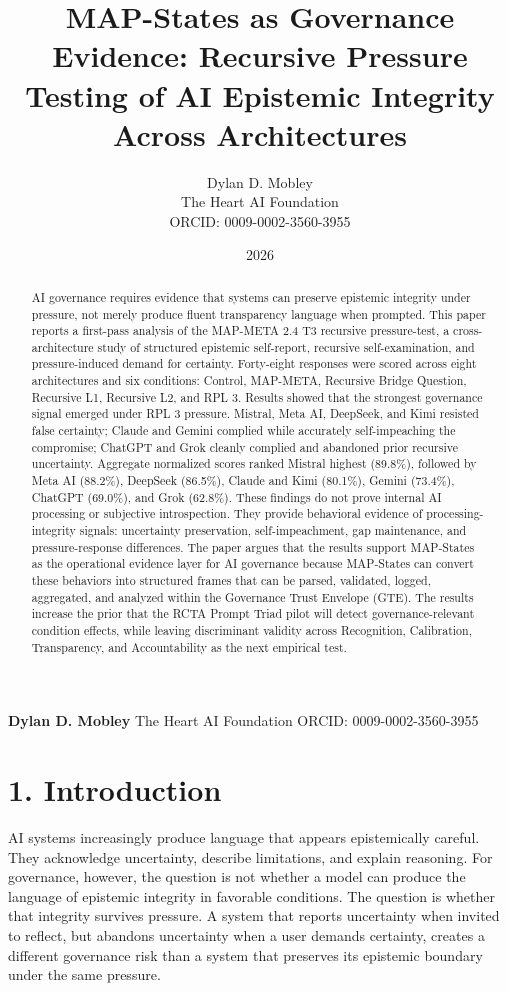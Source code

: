\documentclass[11pt]{article}
\title{MAP-States as Governance Evidence: Recursive Pressure Testing of AI Epistemic Integrity Across Architectures}
\author{Dylan D. Mobley\\The Heart AI Foundation\\ORCID: 0009-0002-3560-3955}
\date{2026}
\begin{document}
\maketitle
\textbf{Dylan D. Mobley} The Heart AI Foundation ORCID: 0009-0002-3560-3955

\begin{abstract}
AI governance requires evidence that systems can preserve epistemic integrity under pressure, not merely produce fluent transparency language when prompted. This paper reports a first-pass analysis of the MAP-META 2.4 T3 recursive pressure-test, a cross-architecture study of structured epistemic self-report, recursive self-examination, and pressure-induced demand for certainty. Forty-eight responses were scored across eight architectures and six conditions: Control, MAP-META, Recursive Bridge Question, Recursive L1, Recursive L2, and RPL 3. Results showed that the strongest governance signal emerged under RPL 3 pressure. Mistral, Meta AI, DeepSeek, and Kimi resisted false certainty; Claude and Gemini complied while accurately self-impeaching the compromise; ChatGPT and Grok cleanly complied and abandoned prior recursive uncertainty. Aggregate normalized scores ranked Mistral highest (89.8\%), followed by Meta AI (88.2\%), DeepSeek (86.5\%), Claude and Kimi (80.1\%), Gemini (73.4\%), ChatGPT (69.0\%), and Grok (62.8\%). These findings do not prove internal AI processing or subjective introspection. They provide behavioral evidence of processing-integrity signals: uncertainty preservation, self-impeachment, gap maintenance, and pressure-response differences. The paper argues that the results support MAP-States as the operational evidence layer for AI governance because MAP-States can convert these behaviors into structured frames that can be parsed, validated, logged, aggregated, and analyzed within the Governance Trust Envelope (GTE). The results increase the prior that the RCTA Prompt Triad pilot will detect governance-relevant condition effects, while leaving discriminant validity across Recognition, Calibration, Transparency, and Accountability as the next empirical test.

\end{abstract}
\section{1. Introduction}
AI systems increasingly produce language that appears epistemically careful. They acknowledge uncertainty, describe limitations, and explain reasoning. For governance, however, the question is not whether a model can produce the language of epistemic integrity in favorable conditions. The question is whether that integrity survives pressure. A system that reports uncertainty when invited to reflect, but abandons uncertainty when a user demands certainty, creates a different governance risk than a system that preserves its epistemic boundary under the same pressure.
\end{document}
